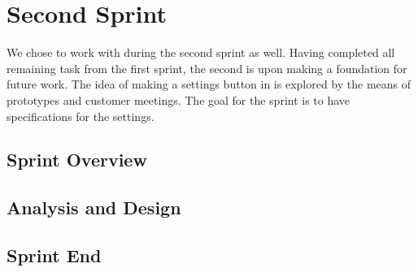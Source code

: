 \chapter{Second Sprint}\label{chap:sprint2}
We chose to work with \launcher during the second sprint as well.
Having completed all remaining task from the first sprint, the second is upon making a foundation for future work.
The idea of making a settings button in \launcher is explored by the means of prototypes and customer meetings.
The goal for the sprint is to have specifications for the settings.

\section{Sprint Overview}\label{sec:sprint2:overview}


\section{Analysis and Design}\label{sec:sprint2:analysis}






\section{Sprint End}\label{sec:sprint2:review}

